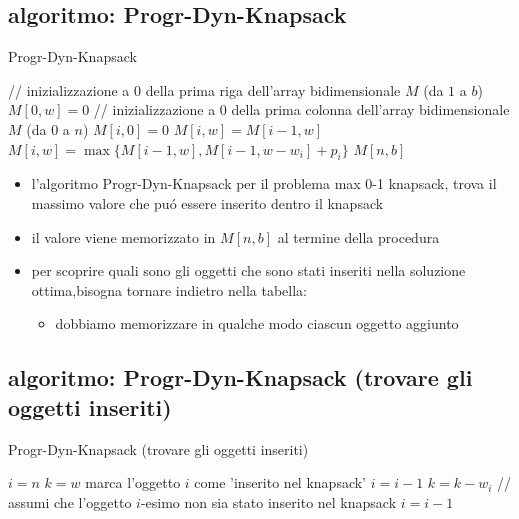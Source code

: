 \subsection*{algoritmo: Progr-Dyn-Knapsack}
\begin{flushleft}
	\begin{algorithm}
		\caption{Progr-Dyn-Knapsack}
		\begin{algorithmic}
			\STATE \color{gray} // inizializzazione a $0$ della prima riga dell'array bidimensionale $M$ (da $1$ a $b$) \color{black}
				\STATE $M[0,w]=0$
			\ENDFOR
			\STATE \color{gray} // inizializzazione a $0$ della prima colonna dell'array bidimensionale $M$ (da $0$ a $n$) \color{black}
				\STATE $M[i,0]=0$
			\ENDFOR
						\STATE $M[i,w]=M[i-1,w]$
					\ELSE
						\STATE $M[i,w]=\max\{M[i-1,w],M[i-1,w-w_i]+p_i\}$
					\ENDIF
				\ENDFOR
			\ENDFOR
			\RETURN $M[n,b]$
		\end{algorithmic}
	\end{algorithm}
	\begin{itemize}
		\item l'algoritmo Progr-Dyn-Knapsack per il problema max 0-1 knapsack, trova il massimo valore che pu\'o essere inserito dentro il knapsack
		\item il valore viene memorizzato in $M[n,b]$ al termine della procedura
		\item per scoprire quali sono gli oggetti che sono stati inseriti nella soluzione ottima,bisogna tornare indietro nella tabella:
		\begin{itemize}
			\item dobbiamo memorizzare in qualche modo ciascun oggetto aggiunto
		\end{itemize}
	\end{itemize}
\end{flushleft}


\subsection*{algoritmo: Progr-Dyn-Knapsack (trovare gli oggetti inseriti)}
\begin{flushleft}
	\begin{algorithm}
		\caption{Progr-Dyn-Knapsack (trovare gli oggetti inseriti)}
		\begin{algorithmic}
			\STATE $i=n$
			\STATE $k=w$
			\IF{$M[i,k]\neq M[i-1,k]$}
				\STATE marca l'oggetto $i$ come 'inserito nel knapsack'
				\STATE $i=i-1$
				\STATE $k=k-w_i$
			\ELSE
				\STATE \color{gray} // assumi che l'oggetto $i$-esimo non sia stato inserito nel knapsack \color{black}
				\STATE $i=i-1$
			\ENDIF
		\end{algorithmic}
	\end{algorithm}
\end{flushleft}


